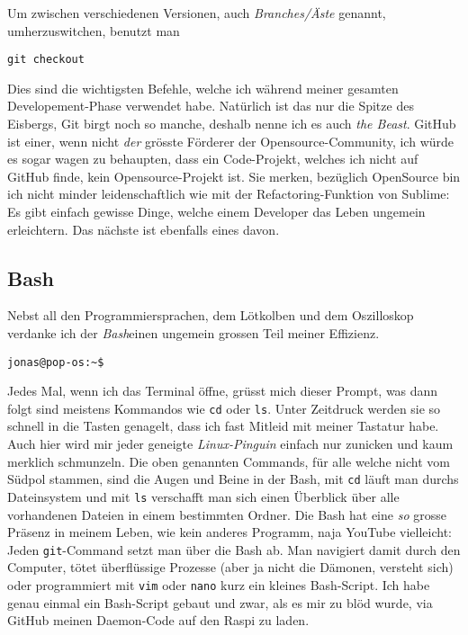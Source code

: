 \documentclass[12pt,titlepage,a4paper]{article}
\begin{document}
Um zwischen verschiedenen Versionen, auch \textit{Branches/Äste} genannt, umherzuswitchen, benutzt man
\begin{verbatim}
git checkout
\end{verbatim}
Dies sind die wichtigsten Befehle, welche ich während meiner gesamten Developement-Phase verwendet habe. Natürlich ist das nur die Spitze des Eisbergs, Git birgt noch so manche, deshalb nenne ich es auch \textit{the Beast}. GitHub ist einer, wenn nicht \textit{der} grösste Förderer der Opensource-Community, ich würde es sogar wagen zu behaupten, dass ein Code-Projekt, welches ich nicht auf GitHub finde, kein Opensource-Projekt ist. Sie merken, bezüglich OpenSource bin ich nicht minder leidenschaftlich wie mit der Refactoring-Funktion von Sublime: Es gibt einfach gewisse Dinge, welche einem Developer das Leben ungemein erleichtern. Das nächste ist ebenfalls eines davon.

\subsection{Bash}
Nebst all den Programmiersprachen, dem Lötkolben und dem Oszilloskop verdanke ich der \textit{Bash}einen ungemein grossen Teil meiner Effizienz.
\begin{verbatim}
jonas@pop-os:~$
\end{verbatim}
Jedes Mal, wenn ich das Terminal öffne, grüsst mich dieser Prompt, was dann folgt sind meistens Kommandos wie \verb&cd& oder \verb&ls&. Unter Zeitdruck werden sie so schnell in die Tasten genagelt, dass ich fast Mitleid mit meiner Tastatur habe. Auch hier wird mir jeder geneigte \textit{Linux-Pinguin} einfach nur zunicken und kaum merklich schmunzeln. Die oben genannten Commands, für alle welche nicht vom Südpol stammen, sind die Augen und Beine in der Bash, mit \verb&cd& läuft man durchs Dateinsystem und mit \verb&ls& verschafft man sich einen Überblick über alle vorhandenen Dateien in einem bestimmten Ordner. Die Bash hat eine \textit{so} grosse Präsenz in meinem Leben, wie kein anderes Programm, naja YouTube vielleicht: Jeden \verb^git^-Command setzt man über die Bash ab. Man navigiert damit durch den Computer, tötet überflüssige Prozesse (aber ja nicht die Dämonen, versteht sich) oder programmiert mit \verb&vim& oder \verb$nano$ kurz ein kleines Bash-Script. Ich habe genau einmal ein Bash-Script gebaut und zwar, als es mir zu blöd wurde, via GitHub meinen Daemon-Code auf den Raspi zu laden.
\end{document}
